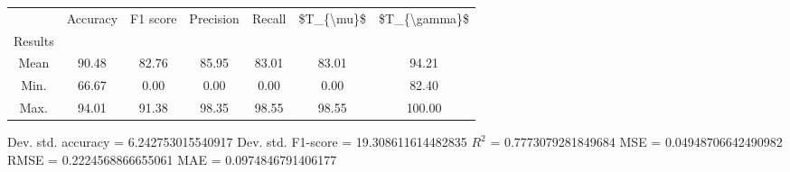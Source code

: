 \begin{tabular}{|c|c|c|c|c|c|c|}
\toprule
{} &  Accuracy &  F1 score &  Precision &  Recall &  \$T\_\{\textbackslash mu\}\$ &  \$T\_\{\textbackslash gamma\}\$ \\
Results &           &           &            &         &            &               \\
\hline
Mean    &     90.48 &     82.76 &      85.95 &   83.01 &      83.01 &         94.21 \\
Min.    &     66.67 &      0.00 &       0.00 &    0.00 &       0.00 &         82.40 \\
Max.    &     94.01 &     91.38 &      98.35 &   98.55 &      98.55 &        100.00 \\
\bottomrule
\end{tabular}

 Dev. std. accuracy = 6.242753015540917
 Dev. std. F1-score = 19.308611614482835
 $R^2$ = 0.7773079281849684
 MSE = 0.04948706642490982
 RMSE = 0.2224568866655061
 MAE = 0.0974846791406177